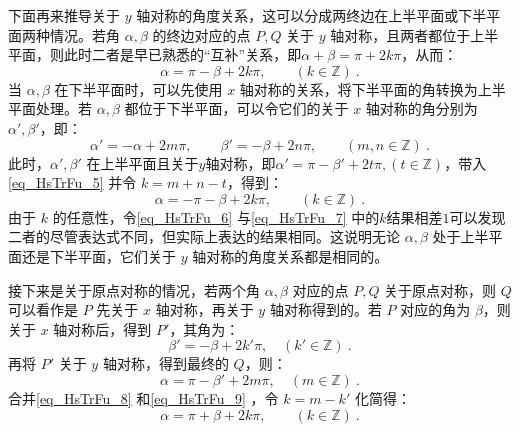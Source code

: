 下面再来推导关于 $y$ 轴对称的角度关系，这可以分成两终边在上半平面或下半平面两种情况。若角 $\alpha, \beta$ 的终边对应的点 $P, Q$ 关于 $y$ 轴对称，且两者都位于上半平面，则此时二者是早已熟悉的“互补”关系，即$\alpha+\beta=\pi+2k\pi$，从而：
\begin{equation}\label{eq_HsTrFu_6}
\alpha = \pi-\beta + 2k\pi, \qquad (k\in\mathbb{Z})~.
\end{equation}
当 $\alpha, \beta$ 在下半平面时，可以先使用 $x$ 轴对称的关系，将下半平面的角转换为上半平面处理。若 $\alpha, \beta$ 都位于下半平面，可以令它们的关于 $x$ 轴对称的角分别为 $\alpha', \beta'$，即：
\begin{equation}
\alpha'= -\alpha + 2m\pi, \qquad \beta' = -\beta + 2n\pi, \qquad (m,n\in\mathbb{Z})~.
\end{equation}
此时，$\alpha', \beta'$ 在上半平面且关于$y$轴对称，即$\alpha'=\pi-\beta'+2t\pi, (t\in\mathbb{Z})$，带入\autoref{eq_HsTrFu_5} 并令 $k = m+n-t$，得到：
\begin{equation}\label{eq_HsTrFu_7}
\alpha = -\pi-\beta + 2k\pi, \qquad (k\in\mathbb{Z})~.
\end{equation}
由于 $k$ 的任意性，令\autoref{eq_HsTrFu_6} 与\autoref{eq_HsTrFu_7} 中的$k$结果相差$1$可以发现二者的尽管表达式不同，但实际上表达的结果相同。这说明无论 $\alpha, \beta$ 处于上半平面还是下半平面，它们关于 $y$ 轴对称的角度关系都是相同的。

接下来是关于原点对称的情况，若两个角 $\alpha, \beta$ 对应的点 $P, Q$ 关于原点对称，则 $Q$ 可以看作是 $P$ 先关于 $x$ 轴对称，再关于 $y$ 轴对称得到的。若 $P$ 对应的角为 $\beta$，则关于 $x$ 轴对称后，得到 $P'$，其角为：
\begin{equation}\label{eq_HsTrFu_8}
\beta'= -\beta + 2k'\pi, \quad (k'\in\mathbb{Z})~.
\end{equation}
再将 $P'$ 关于 $y$ 轴对称，得到最终的 $Q$，则：
\begin{equation}\label{eq_HsTrFu_9}
\alpha = \pi - \beta' + 2m\pi, \quad (m\in\mathbb{Z})~.
\end{equation}
合并\autoref{eq_HsTrFu_8} 和\autoref{eq_HsTrFu_9} ，令 $k =  m-k' $ 化简得：
\begin{equation}\label{eq_HsTrFu_12}
\alpha = \pi + \beta + 2k\pi, \qquad (k\in\mathbb{Z})~.
\end{equation}

